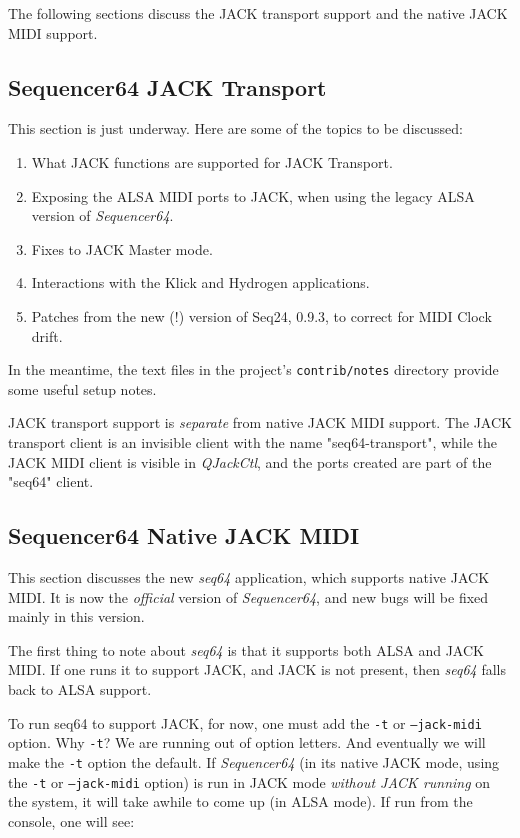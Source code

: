    The following sections discuss the JACK transport support and the native
   JACK MIDI support.

\subsection{Sequencer64 JACK Transport}
\label{subsec:seq64_jack_transport}

   This section is just underway.  Here are some of the topics to be discussed:

   \begin{enumerate}
      \item What JACK functions are supported for JACK Transport.
      \item Exposing the ALSA MIDI ports to JACK, when using the legacy
         ALSA version of \textsl{Sequencer64}.
      \item Fixes to JACK Master mode.
      \item Interactions with the Klick and Hydrogen applications.
      \item Patches from the new (!) version of Seq24, 0.9.3, to correct
         for MIDI Clock drift.
   \end{enumerate}

   In the meantime, the text files in the project's \texttt{contrib/notes}
   directory provide some useful setup notes.

   JACK transport support is \textsl{separate} from native JACK MIDI support.
   The JACK transport client is an invisible client with the
   name "seq64-transport", while the JACK MIDI client is visible in
   \textsl{QJackCtl}, and the ports created are part of the
   "seq64" client.

\subsection{Sequencer64 Native JACK MIDI}
\label{subsec:seq64_jack_native_midi}

   This section discusses the new \textsl{seq64} application, which supports
   native JACK MIDI.  It is now the \textsl{official} version of
   \textsl{Sequencer64}, and new bugs will be fixed mainly in this version.

   The first thing to note about \textsl{seq64}
   is that it supports both ALSA and JACK
   MIDI.  If one runs it to support JACK, and JACK is not present, then
   \textsl{seq64}
   falls back to ALSA support.

   To run seq64 to support JACK, for now, one must add the
   \texttt{-t} or \texttt{--jack-midi}
   option.  Why \texttt{-t}?  We are running out of option letters.
   And eventually we will make the \texttt{-t} option the default.
   If \textsl{Sequencer64} (in its native JACK mode, using the
   \texttt{-t} or \texttt{--jack-midi} option)
   is run in JACK mode \textsl{without JACK running} on
   the system, it will take awhile to come up (in ALSA mode).  If run from the
   console, one will see:

